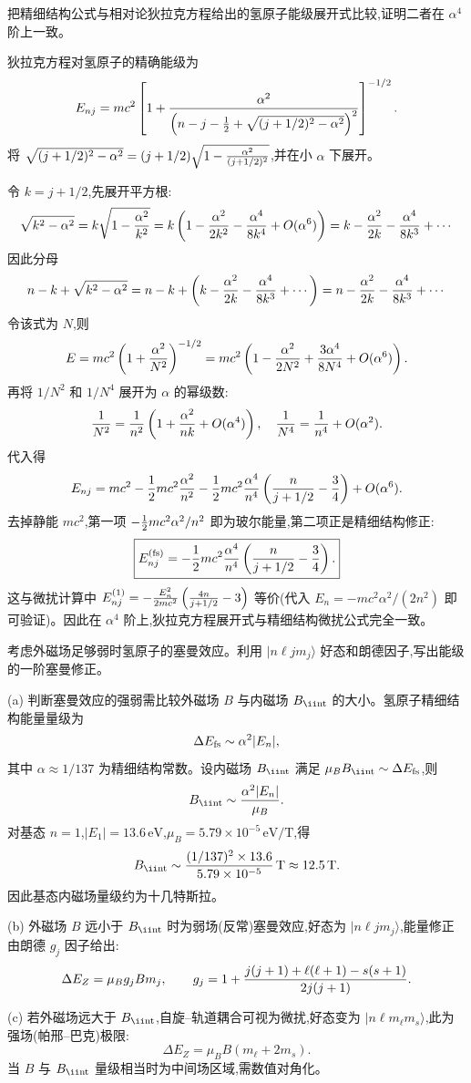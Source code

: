\begin{question}
把精细结构公式与相对论狄拉克方程给出的氢原子能级展开式比较,证明二者在 $\alpha^4$ 阶上一致。
\begin{solution}
狄拉克方程对氢原子的精确能级为
\[
E_{nj}=mc^2\left[1+{\alpha^2\over\left(n-j-{1\over2}+\sqrt{(j+1/2)^2-\alpha^2}\right)^2}\right]^{-1/2}.
\]
将 $\sqrt{(j+1/2)^2-\alpha^2}=(j+1/2)\sqrt{1-{\alpha^2\over(j+1/2)^2}}$,并在小 $\alpha$ 下展开。

令 $k=j+1/2$,先展开平方根:
\[
\sqrt{k^2-\alpha^2}=k\sqrt{1-{\alpha^2\over k^2}}
=k\left(1-{\alpha^2\over2k^2}-{\alpha^4\over8k^4}+O(\alpha^6)\right)
=k-{\alpha^2\over2k}-{\alpha^4\over8k^3}+\cdots
\]
因此分母
\[
n-k+\sqrt{k^2-\alpha^2} = n-k+\left(k-{\alpha^2\over2k}-{\alpha^4\over8k^3}+\cdots\right)
=n-{\alpha^2\over2k}-{\alpha^4\over8k^3}+\cdots
\]
令该式为 $N$,则
\[
E = mc^2\left(1+{\alpha^2\over N^2}\right)^{-1/2}
= mc^2\left(1-{\alpha^2\over2N^2}+{3\alpha^4\over8N^4}+O(\alpha^6)\right).
\]
再将 $1/N^2$ 和 $1/N^4$ 展开为 $\alpha$ 的幂级数:
\[
{1\over N^2} = {1\over n^2}\left(1+{\alpha^2\over nk}+O(\alpha^4)\right),\quad
{1\over N^4} = {1\over n^4}+O(\alpha^2).
\]
代入得
\[
E_{nj}=mc^2-{1\over2}mc^2{\alpha^2\over n^2}
-{1\over2}mc^2{\alpha^4\over n^4}\left({n\over j+1/2}-{3\over4}\right)+O(\alpha^6).
\]
去掉静能 $mc^2$,第一项 $-{1\over2}mc^2\alpha^2/n^2$ 即为玻尔能量,第二项正是精细结构修正:
\[
\boxed{E_{nj}^{\text{(fs)}}=-{1\over2}mc^2{\alpha^4\over n^4}\left({n\over j+1/2}-{3\over4}\right).}
\]
这与微扰计算中 $E_{nj}^{(1)}=-{E_n^2\over2mc^2}\left({4n\over j+1/2}-3\right)$ 等价(代入 $E_n=-mc^2\alpha^2/(2n^2)$ 即可验证)。因此在 $\alpha^4$ 阶上,狄拉克方程展开式与精细结构微扰公式完全一致。
\end{solution}
\end{question}

\begin{question}
考虑外磁场足够弱时氢原子的塞曼效应。利用 $|n\ell jm_j\rangle$ 好态和朗德因子,写出能级的一阶塞曼修正。
\begin{solution}
(a) 判断塞曼效应的强弱需比较外磁场 $B$ 与内磁场 $B_{\rm \ii nt}$ 的大小。氢原子精细结构能量量级为
\[
\Delta E_{\rm fs}\sim \alpha^2 |E_n|,
\]
其中 $\alpha\approx1/137$ 为精细结构常数。设内磁场 $B_{\rm \ii nt}$ 满足 $\mu_B B_{\rm \ii nt}\sim\Delta E_{\rm fs}$,则
\[
B_{\rm \ii nt}\sim {\alpha^2|E_n|\over\mu_B}.
\]
对基态 $n=1$,$|E_1|=13.6\,\mathrm{eV}$,$\mu_B=5.79\times10^{-5}\,\mathrm{eV/T}$,得
\[
B_{\rm \ii nt}\sim {(1/137)^2\times13.6\over5.79\times10^{-5}}\,\mathrm{T}
\approx 12.5\,\mathrm{T}.
\]
因此基态内磁场量级约为十几特斯拉。

(b) 外磁场 $B$ 远小于 $B_{\rm \ii nt}$ 时为弱场(反常)塞曼效应,好态为 $|n\ell j m_j\rangle$,能量修正由朗德 $g_j$ 因子给出:
\[
\Delta E_Z = \mu_B g_j B m_j,\qquad
g_j=1+{j(j+1)+\ell(\ell+1)-s(s+1)\over2j(j+1)}.
\]

(c) 若外磁场远大于 $B_{\rm \ii nt}$,自旋--轨道耦合可视为微扰,好态变为 $|n\ell m_\ell m_s\rangle$,此为强场(帕邢--巴克)极限:
\[
\Delta E_Z = \mu_B B(m_\ell+2m_s).
\]
当 $B$ 与 $B_{\rm \ii nt}$ 量级相当时为中间场区域,需数值对角化。
\end{solution}
\end{question}

